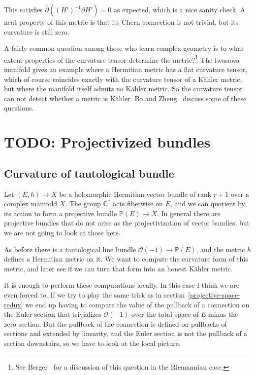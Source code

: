 \documentclass[11pt]{article}
\theoremstyle{definition}
\newcommand{\kk}[1]{\mathbb{#1}}
\newcommand{\cc}[1]{\mathcal{#1}}
\begin{document}
This satisfies $\bar\partial((H')^{-1} \partial H') = 0$ as expected, which is a nice sanity check. A neat property of this metric is that its Chern connection is not trivial, but its curvature is still zero.

A fairly common question among those who learn complex geometry is to what extent properties of the curvature tensor determine the metric?\footnote{See Berger~\cite[Section~4.5]{berger} for a discussion of this question in the Riemannian case.} The Iwasawa manifold gives an example where a Hermitian metric has a flat curvature tensor, which of course coincides exactly with the curvature tensor of a K\"ahler metric, but where the manifold itself admits no K\"ahler metric. So the curvature tensor can not detect whether a metric is K\"ahler. Bo and Zheng~\cite{yang2016curvature} discuss some of these questions.



\section{TODO: Projectivized bundles}



\subsection{Curvature of tautological bundle}

Let $(E, h) \to X$ be a holomorphic Hermitian vector bundle of rank $r + 1$ over a complex manifold $X$. The group $\kk C^*$ acts fiberwise on $E$, and we can quotient by its action to form a projective bundle $\kk P(E) \to X$. In general there are projective bundles that do not arise as the projectivization of vector bundles, but we are not going to look at those here.

As before there is a tautological line bundle $\cc O(-1) \to \kk P(E)$, and the metric $h$ defines a Hermitian metric on it. We want to compute the curvature form of this metric, and later see if we can turn that form into an honest K\"ahler metric.

It is enough to perform these computations locally. In this case I think we are even forced to. If we try to play the same trick as in section~\ref{projective-space-redux} we end up having to compute the value of the pullback of a connection on the Euler section that trivializes $\cc O(-1)$ over the total space of $E$ minus the zero section. But the pullback of the connection is defined on pullbacks of sections and extended by linearity, and the Euler section is not the pullback of a section downstairs, so we have to look at the local picture.
\end{document}
